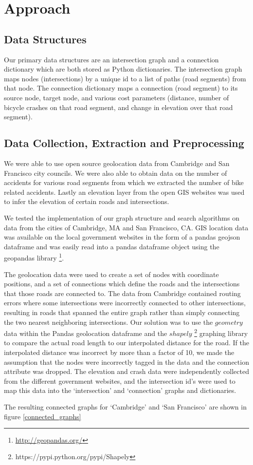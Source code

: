 \documentclass[11pt]{article}
\begin{document}
\section{Approach}
\subsection{Data Structures}
Our primary data structures are an intersection graph and a connection dictionary which are both stored as Python dictionaries. The intersection graph maps nodes (intersections) by a unique id to a list of paths (road segments) from that node. The connection dictionary maps a connection (road segment) to its source node, target node, and various cost parameters (distance, number of bicycle crashes on that road segment, and change in elevation over that road segment).

\subsection{Data Collection, Extraction and Preprocessing}
We were able to use open source geolocation data from Cambridge and San Francisco city councils. We were also able to obtain data on the number of accidents for various road segments from which we extracted the number of bike related accidents. Lastly an elevation layer from the open GIS websites was used to infer the elevation of certain roads and intersections.

We tested the implementation of our graph structure and search algorithms on data from the cities of Cambridge, MA and San Francisco, CA. GIS location data was available on the local government websites in the form of a pandas geojson dataframe and was easily read into a pandas dataframe object using the geopandas library \footnote{\url{http://geopandas.org/}}.
\par
The geolocation data were used to create a set of nodes with coordinate positions, and a set of connections which define the roads and the intersections that those roads are connected to. The data from Cambridge contained routing errors where some intersections were incorrectly connected to other intersections, resulting in roads that spanned the entire graph rather than simply connecting the two nearest neighboring intersections. Our solution was to use the $geometry$ data within the Pandas geolocation dataframe and the $shapely$ \footnote{https://pypi.python.org/pypi/Shapely} graphing library to compare the actual road length to our interpolated distance for the road. If the interpolated distance was incorrect by more than a factor of 10, we made the assumption that the nodes were incorrectly tagged in the data and the connection attribute was dropped. The elevation and crash data were independently collected from the different government websites, and the intersection id's were used to map this data into the `intersection' and `connection' graphs and dictionaries.
\par The resulting connected graphs for `Cambridge' and `San Francisco' are shown in figure \ref{connected_graphs}
\end{document}
